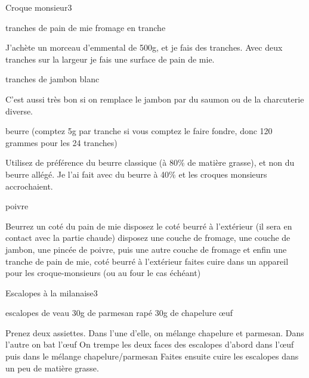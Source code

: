 \begin{recette}{Croque monsieur}{3}{}{}
\begin{ingredients}
 tranches de pain de mie
\ingredient fromage en tranche
\begin{remarque}
J'achète un morceau d'emmental de 500g, et je fais des tranches. Avec deux tranches sur la largeur je fais une surface de pain de mie.
\end{remarque}

 tranches de jambon blanc
\begin{remarque}
C'est aussi très bon si on remplace le jambon par du saumon ou de la charcuterie diverse.
\end{remarque}

\ingredient beurre (comptez 5g par tranche si vous comptez le faire fondre, donc 120 grammes pour les 24 tranches)
\begin{attention}
Utilisez de préférence du beurre classique (à 80\% de matière grasse), et non du beurre allégé. Je l'ai fait avec du beurre à 40\% et les croques monsieurs accrochaient.
\end{attention}

\ingredient poivre
\end{ingredients}

\begin{preparation}
\etape Beurrez un coté du pain de mie
\etape disposez le coté beurré à l'extérieur (il sera en contact avec la partie chaude)
\etape disposez une couche de fromage, une couche de jambon, une pincée de poivre, puis une autre couche de fromage et enfin une tranche de pain de mie, coté beurré à l'extérieur
\etape faites cuire dans un appareil pour les croque-monsieurs (ou au four le cas échéant)
\end{preparation}

\end{recette}

\begin{recette}{Escalopes à la milanaise}{3}{}{}
\begin{ingredients}
 escalopes de veau
\ingredient 30g de parmesan rapé
\ingredient 30g de chapelure
 œuf
\end{ingredients}

\begin{preparation}
\etape Prenez deux assiettes. Dans l'une d'elle, on mélange chapelure et parmesan. Dans l'autre on bat l'œuf
\etape On trempe les deux faces des escalopes d'abord dans l'œuf puis dans le mélange chapelure/parmesan
\etape Faites ensuite cuire les escalopes dans un peu de matière grasse.
\end{preparation}
\end{recette}

